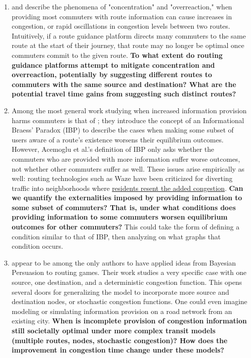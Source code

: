 \documentclass[JEL]{AEA}
\begin{document}
\begin{enumerate}
\item \cite{arnott-199} and \cite{ben-akiva-1991} describe the phenomena of "concentration" and "overreaction," when providing most commuters with route information can cause increases in congestion, or rapid oscillations in congestion levels between two routes. Intuitively, if a route guidance platform directs many commuters to the same route at the start of their journey, that route may no longer be optimal once commuters commit to the given route. \textbf{To what extent do routing guidance platforms attempt to mitigate concentration and overreaction, potentially by suggesting different routes to commuters with the same source and destination? What are the potential travel time gains from suggesting such distinct routes?}

\item Among the most general work studying when increased information provision harms commuters is that of \cite{acemoglu-2016}; they introduce the concept of an Informational Braess' Paradox (IBP) to describe the cases when making some subset of users aware of a route's existence worsens their equilibrium outcomes. However, Acemoglu et al.'s definition of IBP only asks whether the commuters who are provided with more information suffer worse outcomes, not whether other commuters suffer as well. These issues arise empirically as well: routing technologies such as Waze have been criticized for diverting traffic into neighborhoods where \href{https://www.washingtonpost.com/local/traffic-weary-homeowners-and-waze-are-at-war-again-guess-whos-winning/2016/06/05/c466df46-299d-11e6-b989-4e5479715b54_story.html}{residents resent the added congestion}. \textbf{Can we quantify the externalities imposed by providing information to some subset of commuters? That is, under what conditions does providing information to some commuters worsen equilibrium outcomes for other commuters?} This could take the form of defining a condition similar to that of IBP, then analyzing on what graphs that condition occurs.


\item \cite{das-2017} appear to be among the only authors to have applied ideas from Bayesian Persuasion to routing games. Their work studies a very specific case with one source, one destination, and a deterministic congestion function. This opens several doors for generalizing the model to incorporate more source and destination nodes, or stochastic congestion functions. One could even imagine modeling or simulating information provision on a road network from an existing city. \textbf{When is incomplete provision of congestion information still societally optimal under more complex transit models (multiple routes, nodes, stochastic congestion)? How does the improvement in congestion time change under these models?}


\end{enumerate}
\end{document}
